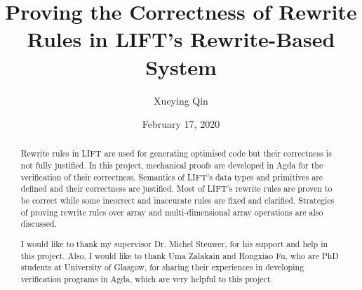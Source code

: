 \documentclass{l4proj}
\begin{document}
\title{Proving the Correctness of Rewrite Rules in LIFT's Rewrite-Based System}
\author{Xueying Qin}
\date{February 17, 2020}

\maketitle

\begin{abstract}
Rewrite rules in LIFT are used for generating optimised code but their correctness is not fully justified. In this project, mechanical proofs are developed in Agda for the verification of their correctness. Semantics of LIFT's data types and primitives are defined and their correctness are justified. Most of LIFT's rewrite rules are proven to be correct while some incorrect and inaccurate rules are fixed and clarified. Strategies of proving rewrite rules over array and multi-dimensional array operations are also discussed.
\end{abstract}


%

\def\consentname {Xueying Qin} %
\def\consentdate {30 March 2020} %
%
\educationalconsent
\renewcommand{\abstractname}{Acknowledgements}
\begin{abstract}
I would like to thank my supervisor Dr. Michel Steuwer, for his support and help in this project. Also, I would like to thank Uma Zalakain and Rongxiao Fu, who are PhD students at University of Glasgow, for sharing their experiences in developing verification programs in Agda, which are very helpful to this project.

\end{abstract}
\end{document}
